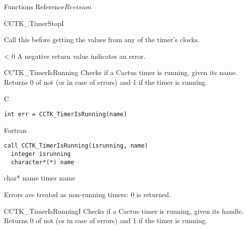 \begin{cactuspart}{ Functions Reference}{}{$Revision$}
\begin{FunctionDescription}{CCTK\_TimerStopI}
\begin{Discussion}
Call this before getting the values from any of the timer's clocks.
\end{Discussion}

\begin{ErrorSection}
\begin{Error}{< 0}
A negative return value indicates an error.
\end{Error}
\end{ErrorSection}
\end{FunctionDescription}

\begin{FunctionDescription}{CCTK\_TimerIsRunning}
\label{CCTK-TimerIsRunning}
Checks if a Cactus timer is running, given its name.
Returns 0 of not (or in case of errors) and 1 if the timer is running.

\begin{SynopsisSection}
\begin{Synopsis}{C}
\begin{verbatim}
int err = CCTK_TimerIsRunning(name)
\end{verbatim}
\end{Synopsis}
\begin{Synopsis}{Fortran}
\begin{verbatim}
call CCTK_TimerIsRunning(isrunning, name)
  integer isrunning
  character*(*) name
\end{verbatim}
\end{Synopsis}
\end{SynopsisSection}

\begin{ParameterSection}
\begin{Parameter} {char* name}
timer name
\end{Parameter}
\end{ParameterSection}

\begin{Discussion}
Errors are treated as non-running timers: 0 is returned.
\end{Discussion}

\end{FunctionDescription}

\begin{FunctionDescription}{CCTK\_TimerIsRunningI}
\label{CCTK-TimerIsRunningI}
Checks if a Cactus timer is running, given its handle.
Returns 0 of not (or in case of errors) and 1 if the timer is running.


\end{FunctionDescription}
\end{cactuspart}
